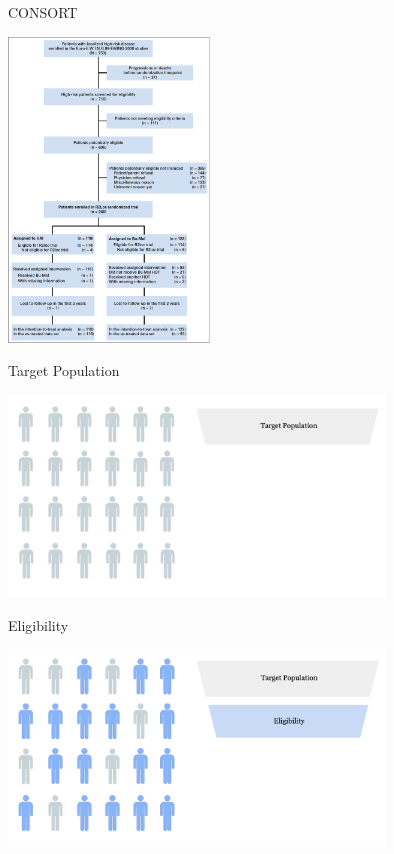 \documentclass[english]{beamer}\usepackage[]{graphicx}\usepackage[]{xcolor}
\begin{document}
\begin{frame}{CONSORT}
\begin{center}
\includegraphics[width=0.4\textwidth]{whelan_flow.png}
\end{center}
\end{frame}

\begin{frame}{Target Population}

\includegraphics[width=100mm,scale=1]{targetpop.png}

\end{frame}

\begin{frame}{Eligibility}

\includegraphics[width=100mm,scale=1]{eligibility.png}

\end{frame}
\end{document}
